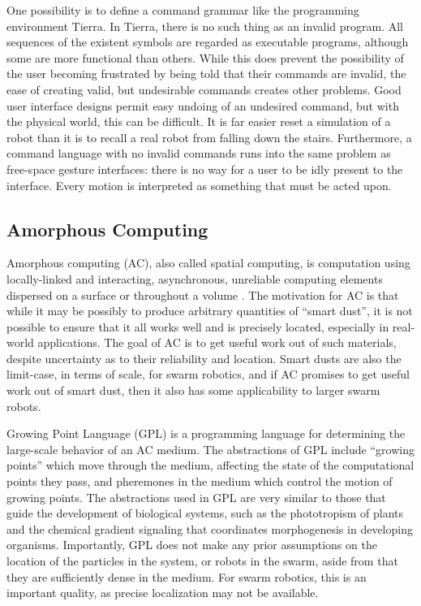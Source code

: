 \documentclass[]{article}
\begin{document}
One possibility is to define a command grammar like the programming environment Tierra.  
In Tierra, there is no such thing as an invalid program. 
All sequences of the existent symbols are regarded as executable programs, although some are more functional than others. 
While this does prevent the possibility of the user becoming frustrated by being told that their commands are invalid, the ease of creating valid, but undesirable commands creates other problems. 
Good user interface designs permit easy undoing of an undesired command, but with the physical world, this can be difficult. 
It is far easier reset a simulation of a robot than it is to recall a real robot from falling down the stairs. 
Furthermore, a command language with no invalid commands runs into the same problem as free-space gesture interfaces: there is no way for a user to be idly present to the interface.
Every motion is interpreted as something that must be acted upon. 

\subsection{Amorphous Computing}

Amorphous computing (AC), also called spatial computing, is computation using locally-linked and interacting, asynchronous, unreliable computing elements dispersed on a surface or throughout a volume \cite{abelson2000amorphous}. 
The motivation for AC is that while it may be possibly to produce arbitrary quantities of ``smart dust'', it is not possible to ensure that it all works well and is precisely located, especially in real-world applications.
The goal of AC is to get useful work out of such materials, despite uncertainty as to their reliability and location. 
Smart dusts are also the limit-case, in terms of scale, for swarm robotics, and if AC promises to get useful work out of smart dust, then it also has some applicability to larger swarm robots.

Growing Point Language (GPL) is a programming language for determining the large-scale behavior of an AC medium.
The abstractions of GPL include ``growing points'' which move through the medium, affecting the state of the computational points they pass, and pheremones in the medium which control the motion of growing points.
The abstractions used in GPL are very similar to those that guide the development of biological systems, such as the phototropism of plants and the chemical gradient signaling that coordinates morphogenesis in developing organisms.   
Importantly, GPL does not make any prior assumptions on the location of the particles in the system, or robots in the swarm, aside from that they are sufficiently dense in the medium. 
For swarm robotics, this is an important quality, as precise localization may not be available. 
 
\end{document}
